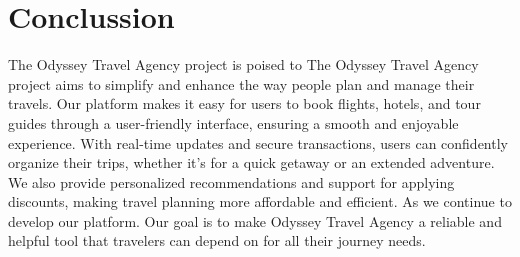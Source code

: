 \documentclass{scrreprt}
\begin{document}
\section*{Conclussion}
The Odyssey Travel Agency project is poised to The Odyssey Travel Agency project aims to simplify and enhance the way people plan and manage their travels. Our platform makes it easy for users to book flights, hotels, and tour guides through a user-friendly interface, ensuring a smooth and enjoyable experience. With real-time updates and secure transactions, users can confidently organize their trips, whether it's for a quick getaway or an extended adventure. We also provide personalized recommendations and support for applying discounts, making travel planning more affordable and efficient. As we continue to develop our platform. Our goal is to make Odyssey Travel Agency a reliable and helpful tool that travelers can depend on for all their journey needs.
\end{document}
